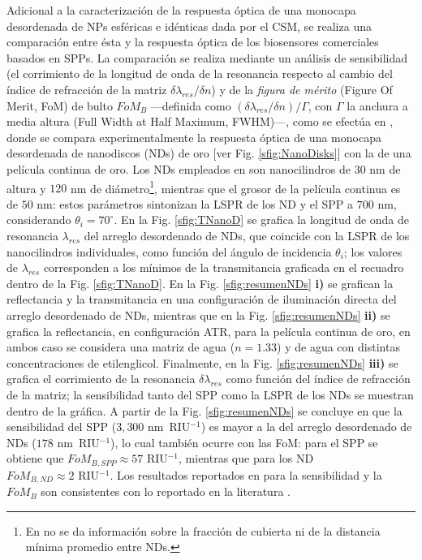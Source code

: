 Adicional a la caracterización de la respuesta óptica de una monocapa desordenada de NPs esféricas e idénticas dada por el CSM, se realiza una comparación entre ésta y la respuesta óptica de los biosensores comerciales basados en SPPs. La comparación se realiza mediante un análisis de sensibilidad (el corrimiento de la longitud de onda de la resonancia respecto al cambio del índice de refracción de la matriz $\delta\lambda_{res}/\delta n$) y de la \emph{figura de mérito} (Figure Of Merit, FoM) de bulto $\textit{FoM}_B$ ---definida como $(\delta\lambda_{res}/\delta n)/\Gamma$, con $\Gamma$ la anchura a media altura (Full Width at Half Maximum, FWHM)---, como se  efectúa en \cite{svedendahl2009refractometric}, donde se compara experimentalmente la respuesta óptica de una monocapa desordenada de nanodiscos (NDs)  de oro [ver Fig. \ref{sfig:NanoDisks}] con la de una película continua de oro. Los NDs empleados en \cite{svedendahl2009refractometric} son nanocilindros de $30$ nm de altura y  $120$ nm de diámetro\footnote{En \cite{svedendahl2009refractometric} no se da información sobre la fracción de cubierta ni de la distancia mínima promedio entre NDs.}, mientras que el grosor de la película continua es de $50$ nm: estos parámetros sintonizan la LSPR de los ND y el SPP a $700$ nm, considerando $\theta_i=70^\circ$. En la Fig. \ref{sfig:TNanoD} se grafica la longitud de onda de resonancia  $\lambda_{res}$ del arreglo desordenado de NDs, que coincide con la LSPR de los nanocilindros individuales, como función del ángulo de incidencia $\theta_i$; los valores de $\lambda_{res}$ corresponden a los mínimos de la transmitancia graficada en el recuadro dentro de la Fig. \ref{sfig:TNanoD}. En la Fig. \ref{sfig:resumenNDs} \textbf{i)} se grafican la reflectancia y la transmitancia  en una configuración de iluminación directa del arreglo desordenado de NDs, mientras que en la Fig. \ref{sfig:resumenNDs} \textbf{ii)} se grafica la reflectancia, en configuración ATR, para la película continua de oro, en ambos caso se considera una matriz de agua ($n=1.33$) y de agua con distintas concentraciones de etilenglicol. Finalmente, en la Fig. \ref{sfig:resumenNDs} \textbf{iii)} se grafica el corrimiento de la resonancia $\delta\lambda_{res}$ como función del índice de refracción de la matriz; la sensibilidad tanto del SPP como la LSPR de los NDs se muestran dentro de la gráfica. A partir de la Fig. \ref{sfig:resumenNDs} se concluye en \cite{svedendahl2009refractometric} que la sensibilidad del SPP ($3,300$ nm~\mbox{RIU$^{-1}$}) es mayor a la del arreglo desordenado de NDs ($178$ nm~\mbox{RIU$^{-1}$}), lo cual también ocurre con las FoM: para el SPP se obtiene que $\textit{FoM}_{B,\textit{SPP}}\approx 57 \mbox{ RIU$^{-1}$}$, mientras que para los ND $\textit{FoM}_{B,\textit{ND}}\approx 2\mbox{ RIU$^{-1}$}$. Los resultados reportados en \cite{svedendahl2009refractometric} para la sensibilidad y la $\textit{FoM}_B$ son consistentes con lo reportado en la literatura \cite{brian2009sensitivity,cahill1997surface}.
 
